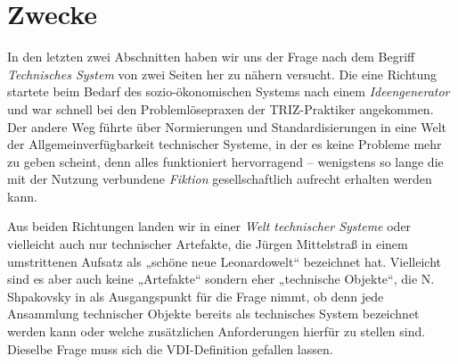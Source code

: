 \documentclass[12pt,a4paper]{article}
\begin{document}
\section{Zwecke}

In den letzten zwei Abschnitten haben wir uns der Frage nach dem Begriff
\emph{Technisches System} von zwei Seiten her zu nähern versucht. Die eine
Richtung startete beim Bedarf des sozio-ökonomischen Systems nach einem
\emph{Ideengenerator} und war schnell bei den Problemlösepraxen der
TRIZ-Praktiker angekommen. Der andere Weg führte über Normierungen und
Standardisierungen in eine Welt der Allgemeinverfügbarkeit technischer
Systeme, in der es keine Probleme mehr zu geben scheint, denn alles
funktioniert hervorragend -- wenigstens so lange die mit der Nutzung
verbundene \emph{Fiktion} gesellschaftlich aufrecht erhalten werden kann.

Aus beiden Richtungen landen wir in einer \emph{Welt technischer Systeme} oder
vielleicht auch nur technischer Artefakte, die Jürgen Mittelstraß in einem
umstrittenen Aufsatz \cite{Mittelstrass2011} als „schöne neue Leonardowelt“
bezeichnet hat.  Vielleicht sind es aber auch keine „Artefakte“ sondern eher
„technische Objekte“, die N. Shpakovsky in \cite{Shpakovsky2003} als
Ausgangspunkt für die Frage nimmt, ob denn jede Ansammlung technischer Objekte
bereits als technisches System bezeichnet werden kann oder welche zusätzlichen
Anforderungen hierfür zu stellen sind.  Dieselbe Frage muss sich die
VDI-Definition gefallen lassen.
\end{document}
